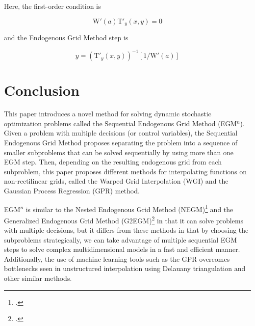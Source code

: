 \documentclass{article}
\newcommand{\aRat}{a}
\newcommand{\xRat}{x}
\newcommand{\TFunc}{\mathrm{T}}
\newcommand{\WFunc}{\mathrm{W}}
\newcommand{\yRat}{y}
\begin{document}
Here, the first-order condition is

\begin{equation}
\WFunc'(\aRat)\TFunc'_{\yRat}(\xRat,\yRat)  = 0
\end{equation}

and the Endogenous Grid Method step is

\begin{equation}
\yRat = \left(\TFunc'_{\yRat}(\xRat,\yRat)\right)^{-1} \left[ 1 / \WFunc'(\aRat)\right]
\end{equation}

\section{Conclusion}\label{conclusion}


This paper introduces a novel method for solving dynamic stochastic optimization problems called the Sequential Endogenous Grid Method (EGM$^n$). Given a problem with multiple decisions (or control variables), the Sequential Endogenous Grid Method proposes separating the problem into a sequence of smaller subproblems that can be solved sequentially by using more than one EGM step. Then, depending on the resulting endogenous grid from each subproblem, this paper proposes different methods for interpolating functions on non-rectilinear grids, called the Warped Grid Interpolation (WGI) and the Gaussian Process Regression (GPR) method.

EGM$^n$ is similar to the Nested Endogenous Grid Method (NEGM)\footnote{\citet{Druedahl2021}.} and the Generalized Endogenous Grid Method (G2EGM)\footnote{\citet{Druedahl2017}.} in that it can solve problems with multiple decisions, but it differs from these methods in that by choosing the subproblems strategically, we can take advantage of multiple sequential EGM steps to solve complex multidimensional models in a fast and efficient manner. Additionally, the use of machine learning tools such as the GPR overcomes bottlenecks seen in unstructured interpolation using Delauany triangulation and other similar methods.

\end{document}
